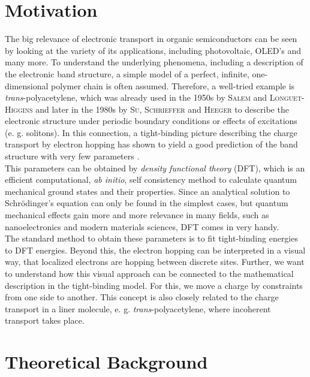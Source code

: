 \section{Motivation}
The big relevance of electronic transport in organic semiconductors can be seen by looking at the variety of its applications, including photovoltaic, OLED's and many more. To understand the underlying phenomena, including a description of the electronic band structure, a simple model of a perfect, infinite, one-dimensional polymer chain is often assumed. Therefore, a well-tried example is \emph{trans}-polyacetylene, which was already used in the 1950s by \textsc{Salem} and \textsc{Longuet-Higgins} and later in the 1980s by \textsc{Su, Schrieffer} and \textsc{Heeger} to describe the electronic structure under periodic boundary conditions or effects of excitations (e. g. solitons). In this connection, a tight-binding picture describing the charge transport by electron hopping has shown to yield a good prediction of the band structure with very few parameters  \cite{koehler2015electronic,Longuet-Higgins172,PhysRevLett.42.1698}.\\
This parameters can be obtained by \emph{density functional theory} (DFT), which is an efficient computational, \emph{ab initio}, self consistency method to calculate quantum mechanical ground states and their properties. Since an analytical solution to Schrödinger's equation can only be found in the simplest cases, but quantum mechanical effects gain more and more relevance in many fields, such as nanoelectronics and modern materials sciences, DFT comes in very handy.\\
The standard method to obtain these parameters is to fit tight-binding energies to DFT energies. Beyond this, the electron hopping can be interpreted in a visual way, that localized electrons are hopping between discrete sites. Further, we want to understand how this visual approach can be connected to the mathematical description in the tight-binding model. For this, we move a charge by constraints from one side to another. This concept is also closely related to the charge transport in a liner molecule, e. g. \emph{trans}-polyacetylene, where incoherent transport takes place.\\

\section{Theoretical Background}

